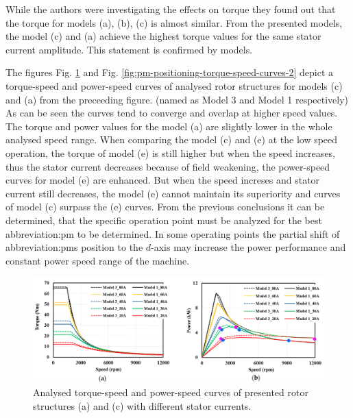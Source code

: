 \documentclass[a4paper, twoside, 11pt]{article}
\begin{document}
    While the authors were investigating the effects on torque they found out that the torque for models (a), (b), (c) is almost similar. From the presented models, the model (c) and (a) achieve the highest torque values for the same stator current amplitude. This statement is confirmed by models.\par
    The figures Fig. \ref{fig:pm-positioning-torque-speed-curves} and Fig. \ref{fig:pm-positioning-torque-speed-curves-2} depict a torque-speed and power-speed curves of analysed rotor structures for models (c) and (a) from the preceeding figure. (named as Model 3 and Model 1 respectively) As can be seen the curves tend to converge and overlap at higher speed values. The torque and power values for the model (a) are slightly lower in the whole analysed speed range. When comparing the model (c) and (e) at the low speed operation, the torque of model (e) is still higher but when the speed increases, thus the stator current decreases because of field weakening, the power-speed curves for model (e) are enhanced. But when the speed increses and stator current still decreases, the model (e) cannot maintain its superiority and curves of model (c) surpass the (e) curves. \cite{ngo-performance-analysis-of-synchronous-reluctance-motor-with-limited-amount-of-permanent-magnet}
    From the previous conclusions it can be determined, that the specific operation point must be analyzed for the best \gls{abbreviation:pm} to be determined. In some operating points the partial shift of \gls{abbreviation:pm}s position to the $d$-axis may increase the power performance and constant power speed range of the machine.

    \begin{figure}[htbp!]
            \centering
            \includegraphics[width=1\textwidth]{src/png/pm-positioning-torque-speed-curves.png}
            \caption{Analysed torque-speed and power-speed curves of presented rotor structures (a) and (c) with different stator currents. \cite{ngo-performance-analysis-of-synchronous-reluctance-motor-with-limited-amount-of-permanent-magnet}}
            \label{fig:pm-positioning-torque-speed-curves}
    \end{figure}
\end{document}
